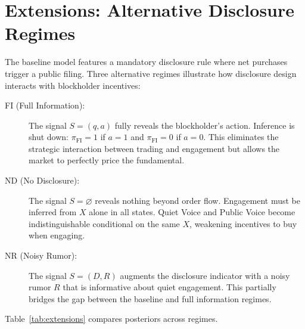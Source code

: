 \documentclass[11pt,a4paper]{article}
\newcommand{\1}{\mathbf{1}}
\begin{document}
\section{Extensions: Alternative Disclosure Regimes}

The baseline model features a mandatory disclosure rule where net
purchases trigger a public filing. Three alternative regimes illustrate
how disclosure design interacts with blockholder incentives:

\begin{description}
\item[FI (Full Information):] The signal $S = (q, a)$ fully reveals the
  blockholder's action. Inference is shut down: $\pi_{\text{FI}} = 1$
  if $a=1$ and $\pi_{\text{FI}} = 0$ if $a=0$. This eliminates the
  strategic interaction between trading and engagement but allows the
  market to perfectly price the fundamental.

\item[ND (No Disclosure):] The signal $S = \varnothing$ reveals nothing
  beyond order flow. Engagement must be inferred from $X$ alone in all
  states. Quiet Voice and Public Voice become indistinguishable
  conditional on the same $X$, weakening incentives to buy when
  engaging.

\item[NR (Noisy Rumor):] The signal $S = (D, R)$ augments the
  disclosure indicator with a noisy rumor $R$ that is informative
  about quiet engagement. This partially bridges the gap between
  the baseline and full information regimes.
\end{description}

Table~\ref{tab:extensions} compares posteriors across regimes.

\begin{table}[H]
\centering
\caption{Posterior comparison across disclosure regimes.}
\label{tab:extensions}

\end{table}


\printbibliography
\end{document}
